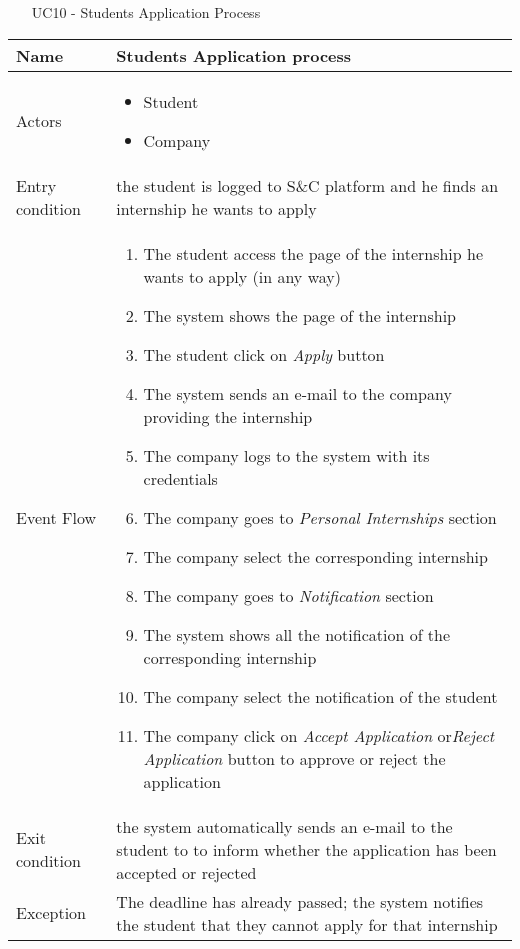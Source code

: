 				
				\begin{table} [H]
					\centering
						\begin{itemize}
						\item [UC10] - Students Application Process
					\end{itemize}
					\begin{tabular}{|| P{7.5cm} | P{7.5cm} ||}
						\hline
						Name & Students Application process \\
						\hline
						Actors & \parbox{5cm}{\begin{itemize}
								\item Student
								\item Company
							\end{itemize}
						} \\
						\hline
						Entry condition & the student is logged to S\&C platform and he finds an internship he wants to apply \\
						\hline
						Event Flow & \parbox{5cm}{\begin{enumerate}[label=\alpha]
								\item The student access the page of the 
								internship he wants to apply (in any way) 
								\item The system shows the page of the 
								internship 
								\item The student click on \textit{Apply} button
								\item  The system sends an e-mail to the 
								company providing the internship
								\item The company logs to the system with 
								its credentials
								\item The company goes to \textit{Personal 
								Internships} section
								\item The company select the 
								corresponding internship
								\item The company goes to \textit{Notification} 
								section 
								\item The system shows all the notification 
								of the corresponding internship
								\item The company select the notification 
								of the student 
								\item The company click on \textit{Accept 
								Application} or\textit{Reject Application}
								button to approve or reject the 
								application
						\end{enumerate}} \\
						\hline 
						Exit condition & the system automatically sends an e-mail to 
						the student to to inform whether the 
						application has been accepted or rejected  \\
						\hline
						Exception & The deadline has already passed; the system notifies the student that they cannot apply for that internship \\
						\hline
					\end{tabular}
				\end{table}
				

